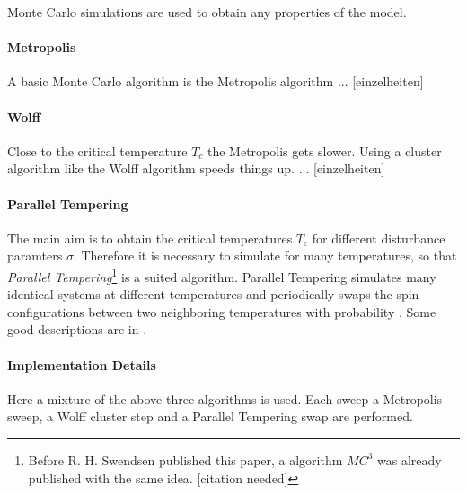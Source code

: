 Monte Carlo simulations are used to obtain any properties of the
model.
\paragraph{Metropolis}
    A basic Monte Carlo algorithm is the Metropolis algorithm
    \cite{Metropolis1953} ... [einzelheiten]
\paragraph{Wolff}
    Close to the critical temperature \(T_c\) the Metropolis
    gets slower. Using a cluster algorithm like the Wolff
    algorithm \cite{Wolff1989} speeds things up.
    ... [einzelheiten]
\paragraph{Parallel Tempering}
    The main aim is to obtain the critical temperatures
    \(T_c\) for different disturbance paramters \(\sigma\).
    Therefore it is necessary to simulate for many temperatures,
    so that \emph{Parallel Tempering}\footnote{Before R. H.
        Swendsen published this paper, a algorithm \(MC^3\) was
        already published with the same idea. [citation needed]}
    \cite{ParallelTempering1986} is a suited algorithm. Parallel
    Tempering simulates many identical systems at different
    temperatures and periodically swaps the spin configurations
    between two neighboring temperatures with probability
    \(\). Some good descriptions are in
    \cite[S. ??]{NewmanBarkema1999} \cite[S. 155ff]{Katzgraber2011}.
\paragraph{Implementation Details}
    Here a mixture of the above three algorithms is used.
    Each sweep a Metropolis sweep, a Wolff cluster step and a
    Parallel Tempering swap are performed.

